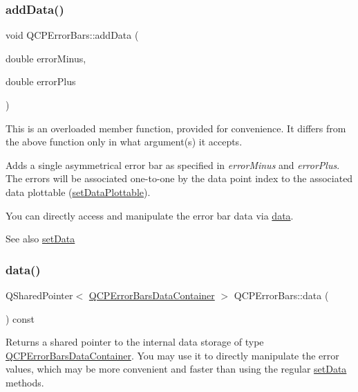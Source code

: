 \subsubsection{\texorpdfstring{addData()}{addData()}\hspace{0.1cm}{\footnotesize\ttfamily [4/4]}}
{\footnotesize\ttfamily void Q\+C\+P\+Error\+Bars\+::add\+Data (\begin{DoxyParamCaption}\item[{double}]{error\+Minus,  }\item[{double}]{error\+Plus }\end{DoxyParamCaption})}

This is an overloaded member function, provided for convenience. It differs from the above function only in what argument(s) it accepts.

Adds a single asymmetrical error bar as specified in {\itshape error\+Minus} and {\itshape error\+Plus}. The errors will be associated one-\/to-\/one by the data point index to the associated data plottable (\mbox{\hyperlink{class_q_c_p_error_bars_aabb42a964cfbf780cd1c79850c7cd989}{set\+Data\+Plottable}}).

You can directly access and manipulate the error bar data via \mbox{\hyperlink{class_q_c_p_error_bars_aeebd1b14f4c3573565efafd514988813}{data}}.

\begin{DoxySeeAlso}{See also}
\mbox{\hyperlink{class_q_c_p_error_bars_a92b1980003255f5f7c05407a4d92aabc}{set\+Data}} 
\end{DoxySeeAlso}
\mbox{\label{class_q_c_p_error_bars_aeebd1b14f4c3573565efafd514988813}} 
\subsubsection{\texorpdfstring{data()}{data()}}
{\footnotesize\ttfamily Q\+Shared\+Pointer$<$ \mbox{\hyperlink{qcustomplot_8h_a8c4472a4da738e0ddbf6b03222c39906}{Q\+C\+P\+Error\+Bars\+Data\+Container}} $>$ Q\+C\+P\+Error\+Bars\+::data (\begin{DoxyParamCaption}{ }\end{DoxyParamCaption}) const\hspace{0.3cm}{\ttfamily [inline]}}

Returns a shared pointer to the internal data storage of type \mbox{\hyperlink{qcustomplot_8h_a8c4472a4da738e0ddbf6b03222c39906}{Q\+C\+P\+Error\+Bars\+Data\+Container}}. You may use it to directly manipulate the error values, which may be more convenient and faster than using the regular \mbox{\hyperlink{class_q_c_p_error_bars_a92b1980003255f5f7c05407a4d92aabc}{set\+Data}} methods. \mbox{\label{class_q_c_p_error_bars_a18b797c62f2af000b926e52eb46d97c7}} 
